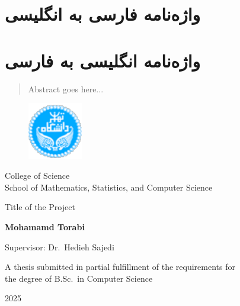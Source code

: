\documentclass[12pt]{report}
\begin{document}
\chapter*{واژه‌نامه فارسی به انگلیسی}

\chapter*{ واژه‌نامه انگلیسی به فارسی}

\begin{thebibliography}{MM}
\end{thebibliography}

\begin{latin}
\begin{abstract}
Abstract goes here...
\end{abstract}
\newpage
\thispagestyle{empty}
\begin{figure}
\centering
\includegraphics[height=2.5cm]{UT-Logo.pdf}
\end{figure}
\begin{center}

College of Science\\
School of Mathematics, Statistics, and Computer Science
\end{center}

\begin{center}
\end{center}

\begin{center}
\huge{Title of the Project}
\end{center}

\begin{center}
\end{center}

\begin{center}
\textbf{
Mohamamd Torabi
}
\end{center}

\begin{center}
Supervisor: Dr.\ Hedieh Sajedi
\end{center}

\vspace{3cm}
\begin{center}
A thesis submitted in partial fulfillment of the requirements for\\
the degree of B.Sc.\ in Computer Science
\end{center}

\begin{center}
2025
\end{center}


\end{latin}
\end{document}
